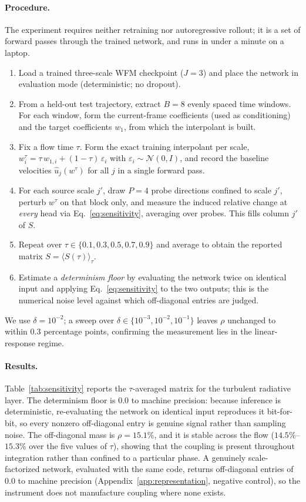 \paragraph{Procedure.}
The experiment requires neither retraining nor autoregressive rollout; it is a
set of forward passes through the trained network, and runs in under a minute on
a laptop.
\begin{enumerate}
  \item Load a trained three-scale WFM checkpoint ($J=3$) and place the network
        in evaluation mode (deterministic; no dropout).
  \item From a held-out test trajectory, extract $B=8$ evenly spaced time
        windows. For each window, form the current-frame coefficients (used as
        conditioning) and the target coefficients $w_1$, from which the
        interpolant is built.
  \item Fix a flow time $\tau$. Form the exact training interpolant per scale,
        $w^{\tau}_i=\tau\,w_{1,i}+(1-\tau)\,\varepsilon_i$ with
        $\varepsilon_i\sim\mathcal{N}(0,I)$, and record the baseline velocities
        $\hat{u}_j(w^{\tau})$ for all $j$ in a single forward pass.
  \item For each source scale $j'$, draw $P=4$ probe directions confined to
        scale $j'$, perturb $w^{\tau}$ on that block only, and measure the
        induced relative change at \emph{every} head via
        Eq.~\eqref{eq:sensitivity}, averaging over probes. This fills column
        $j'$ of $S$.
  \item Repeat over $\tau\in\{0.1,0.3,0.5,0.7,0.9\}$ and average to obtain the
        reported matrix $S=\langle S(\tau)\rangle_\tau$.
  \item Estimate a \emph{determinism floor} by evaluating the network twice on
        identical input and applying Eq.~\eqref{eq:sensitivity} to the two
        outputs; this is the numerical noise level against which off-diagonal
        entries are judged.
\end{enumerate}
We use $\delta=10^{-2}$; a sweep over $\delta\in\{10^{-3},10^{-2},10^{-1}\}$
leaves $\rho$ unchanged to within $0.3$ percentage points, confirming the
measurement lies in the linear-response regime.

\paragraph{Results.}
Table~\ref{tab:sensitivity} reports the $\tau$-averaged matrix for the
turbulent radiative layer. The determinism floor is $0.0$ to machine precision:
because inference is deterministic, re-evaluating the network on identical input
reproduces it bit-for-bit, so every nonzero off-diagonal entry is genuine signal
rather than sampling noise. The off-diagonal mass is $\rho=15.1\%$, and it is
stable across the flow ($14.5\%$--$15.3\%$ over the five values of $\tau$),
showing that the coupling is present throughout integration rather than confined
to a particular phase. A genuinely scale-factorized network, evaluated with the
same code, returns off-diagonal entries of $0.0$ to machine precision
(Appendix~\ref{app:representation}, negative control), so the instrument does not
manufacture coupling where none exists.

